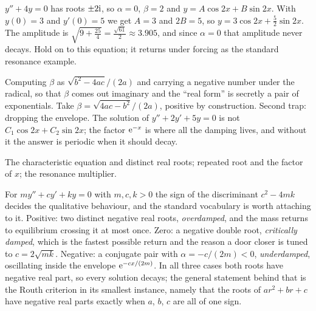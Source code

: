 \begin{worked}
$y''+4y=0$ has roots $\pm2\mathrm{i}$, so $\alpha=0$, $\beta=2$ and $y=A\cos2x+B\sin2x$. With $y(0)=3$ and $y'(0)=5$ we get $A=3$ and $2B=5$, so $y=3\cos2x+\tfrac52\sin2x$. The amplitude is $\sqrt{9+\tfrac{25}{4}}=\tfrac{\sqrt{61}}{2}\approx3.905$, and since $\alpha=0$ that amplitude never decays. Hold on to this equation; it returns under forcing as the standard resonance example.
\end{worked}

\begin{trap}
Computing $\beta$ as $\sqrt{b^{2}-4ac}/(2a)$ and carrying a negative number under the radical, so that $\beta$ comes out imaginary and the ``real form'' is secretly a pair of exponentials. Take $\beta=\sqrt{4ac-b^{2}}/(2a)$, positive by construction. Second trap: dropping the envelope. The solution of $y''+2y'+5y=0$ is not $C_1\cos2x+C_2\sin2x$; the factor $\mathrm{e}^{-x}$ is where all the damping lives, and without it the answer is periodic when it should decay.
\end{trap}

\begin{seealsob}The characteristic equation and distinct real roots; repeated root and the factor of $x$; the resonance multiplier.\end{seealsob}

\begin{keynote}
For $my''+cy'+ky=0$ with $m,c,k>0$ the sign of the discriminant $c^{2}-4mk$ decides the qualitative behaviour, and the standard vocabulary is worth attaching to it. Positive: two distinct negative real roots, \emph{overdamped}, and the mass returns to equilibrium crossing it at most once. Zero: a negative double root, \emph{critically damped}, which is the fastest possible return and the reason a door closer is tuned to $c=2\sqrt{mk}$. Negative: a conjugate pair with $\alpha=-c/(2m)<0$, \emph{underdamped}, oscillating inside the envelope $\mathrm{e}^{-cx/(2m)}$. In all three cases both roots have negative real part, so every solution decays; the general statement behind that is the Routh criterion in its smallest instance, namely that the roots of $ar^{2}+br+c$ have negative real parts exactly when $a$, $b$, $c$ are all of one sign.
\end{keynote}

